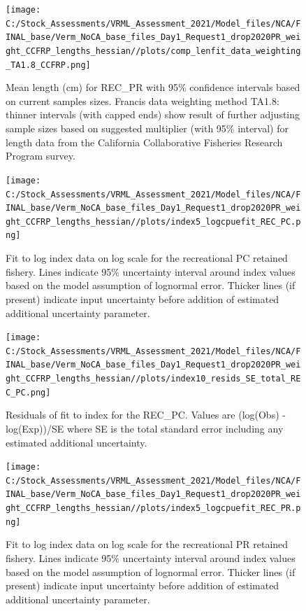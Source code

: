 \documentclass[11pt,
  english,
]{article}
\begin{document}
\begin{figure}
\centering
\texttt{[image: C:/Stock\_Assessments/VRML\_Assessment\_2021/Model\_files/NCA/FINAL\_base/Verm\_NoCA\_base\_files\_Day1\_Request1\_drop2020PR\_weight\_CCFRP\_lengths\_hessian//plots/comp\_lenfit\_data\_weighting\_TA1.8\_CCFRP.png]}
\caption{Mean length (cm) for REC\_PR with 95\% confidence intervals based on current samples sizes. Francis data weighting method TA1.8: thinner intervals (with capped ends) show result of further adjusting sample sizes based on suggested multiplier (with 95\% interval) for length data from the California Collaborative Fisheries Research Program survey.\label{fig:mean-len-fit-CCFRP}}
\end{figure}

\FloatBarrier

\FloatBarrier

\begin{figure}
\centering
\texttt{[image: C:/Stock\_Assessments/VRML\_Assessment\_2021/Model\_files/NCA/FINAL\_base/Verm\_NoCA\_base\_files\_Day1\_Request1\_drop2020PR\_weight\_CCFRP\_lengths\_hessian//plots/index5\_logcpuefit\_REC\_PC.png]}
\caption{Fit to log index data on log scale for the recreational PC retained fishery. Lines indicate 95\% uncertainty interval around index values based on the model assumption of lognormal error. Thicker lines (if present) indicate input uncertainty before addition of estimated additional uncertainty parameter.\label{fig:log-cpue-REC-PC}}
\end{figure}

\begin{figure}
\centering
\texttt{[image: C:/Stock\_Assessments/VRML\_Assessment\_2021/Model\_files/NCA/FINAL\_base/Verm\_NoCA\_base\_files\_Day1\_Request1\_drop2020PR\_weight\_CCFRP\_lengths\_hessian//plots/index10\_resids\_SE\_total\_REC\_PC.png]}
\caption{Residuals of fit to index for the REC\_PC. Values are (log(Obs) - log(Exp))/SE where SE is the total standard error including any estimated additional uncertainty.\label{fig:cpue-resid-REC-PC}}
\end{figure}

\begin{figure}
\centering
\texttt{[image: C:/Stock\_Assessments/VRML\_Assessment\_2021/Model\_files/NCA/FINAL\_base/Verm\_NoCA\_base\_files\_Day1\_Request1\_drop2020PR\_weight\_CCFRP\_lengths\_hessian//plots/index5\_logcpuefit\_REC\_PR.png]}
\caption{Fit to log index data on log scale for the recreational PR retained fishery. Lines indicate 95\% uncertainty interval around index values based on the model assumption of lognormal error. Thicker lines (if present) indicate input uncertainty before addition of estimated additional uncertainty parameter.\label{fig:log-cpue-REC-PR}}
\end{figure}
\end{document}
